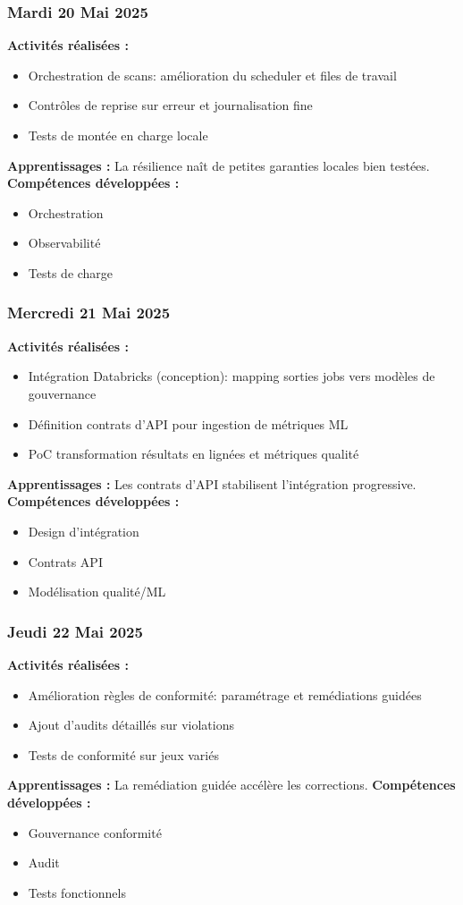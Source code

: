 \documentclass[12pt,a4paper]{article}
\begin{document}
\subsubsection{Mardi 20 Mai 2025}
\textbf{Activités réalisées :}
\begin{itemize}
    \item Orchestration de scans: amélioration du scheduler et files de travail
    \item Contrôles de reprise sur erreur et journalisation fine
    \item Tests de montée en charge locale
\end{itemize}
\textbf{Apprentissages :} La résilience naît de petites garanties locales bien testées.
\textbf{Compétences développées :}
\begin{itemize}
    \item Orchestration
    \item Observabilité
    \item Tests de charge
\end{itemize}

\subsubsection{Mercredi 21 Mai 2025}
\textbf{Activités réalisées :}
\begin{itemize}
    \item Intégration Databricks (conception): mapping sorties jobs vers modèles de gouvernance
    \item Définition contrats d'API pour ingestion de métriques ML
    \item PoC transformation résultats en lignées et métriques qualité
\end{itemize}
\textbf{Apprentissages :} Les contrats d'API stabilisent l'intégration progressive.
\textbf{Compétences développées :}
\begin{itemize}
    \item Design d'intégration
    \item Contrats API
    \item Modélisation qualité/ML
\end{itemize}

\subsubsection{Jeudi 22 Mai 2025}
\textbf{Activités réalisées :}
\begin{itemize}
    \item Amélioration règles de conformité: paramétrage et remédiations guidées
    \item Ajout d'audits détaillés sur violations
    \item Tests de conformité sur jeux variés
\end{itemize}
\textbf{Apprentissages :} La remédiation guidée accélère les corrections.
\textbf{Compétences développées :}
\begin{itemize}
    \item Gouvernance conformité
    \item Audit
    \item Tests fonctionnels
\end{itemize}
\end{document}
